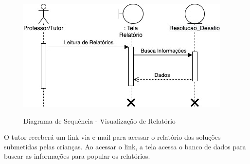         \begin{figure}[H]
            \caption{Diagrama de Sequência - Visualização de Relatório}
            \centering
                \includegraphics[width=\linewidth]{Imagens/Cap3/sequencia_tutor.jpg}
            \label{figura:sequencia_tutor}
        \end{figure}
        
        O tutor receberá um link via e-mail para acessar o relatório das soluções submetidas pelas crianças. Ao acessar o link, a tela acessa o banco de dados para buscar as informações para popular os relatórios.